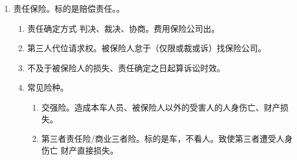 \begin{enumerate}
\begin{enumerate}
        \end{enumerate}
  \item 责任保险。标的是赔偿责任。。
        \begin{enumerate}
          \item 责任确定方式 \yjt 判决、裁决、协商。费用保险公司出。
          \item 第三人代位请求权。被保险人怠于（仅限或裁或诉）找保险公司。
          \item 不及于被保险人的损失、责任确定之日起算诉讼时效。
          \item 常见险种。
                \begin{enumerate}
                  \item 交强险。造成本车人员、被保险人以外的受害人的人身伤亡、财产损失。
                  \item 第三者责任险/商业三者险。标的是车，不看人。致使第三者遭受人身伤亡 \hz 财产直接损失。
                \end{enumerate}
        \end{enumerate}
\end{enumerate}
